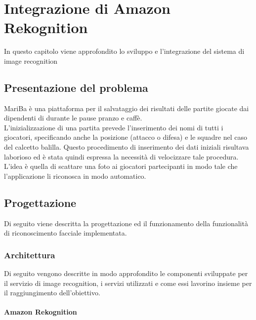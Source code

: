 
\chapter{Integrazione di Amazon Rekognition}
\label{cap:rekognition}

In questo capitolo viene approfondito lo sviluppo e l'integrazione del sistema di image recognition\\


\section{Presentazione del problema}
MariBa è una piattaforma per il salvataggio dei risultati delle partite giocate dai dipendenti di \azienda durante le 
pause pranzo e caffè. \\
L'inizializzazione di una partita prevede l'inserimento dei nomi di tutti i giocatori, specificando anche la posizione (attacco o difesa) e le squadre nel caso del calcetto balilla. Questo procedimento di inserimento dei dati iniziali
risultava laborioso ed è stata quindi espressa la necessità di velocizzare tale procedura. \\
L'idea è quella di scattare una foto ai giocatori partecipanti in modo tale che l'applicazione li riconosca in modo automatico.

\section{Progettazione}
Di seguito viene descritta la progettazione ed il funzionamento della funzionalità di riconoscimento facciale implementata.
	\subsection{Architettura}
	Di seguito vengono descritte in modo approfondito le componenti sviluppate per il servizio di image recognition, i servizi utilizzati e come essi lavorino insieme per il raggiungimento dell'obiettivo. \\
	
	\subsubsection{Amazon Rekognition}
	
